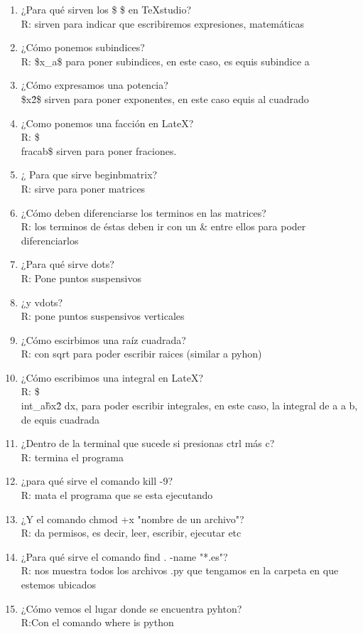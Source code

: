 \documentclass[letterpaper, 12pt, oneside]{article}%
\begin{document}
\begin{enumerate}
\item ¿Para qué sirven los \$ \$ en TeXstudio?\\
R: sirven para indicar que escribiremos expresiones, matemáticas
\item ¿Cómo ponemos subindices?\\
R: \$x\_{a}\$ para poner subindices, en este caso, es equis subindice a
\item ¿Cómo expresamos una potencia?\\ \$x\^{2}\$ sirven para poner exponentes, en este caso equis al cuadrado
\item ¿Como ponemos una facción en LateX?\\ R: \$\\frac{a}{b}\$ sirven para poner fraciones.
\item ¿ Para que sirve begin{bmatrix}?\\ R: sirve para poner matrices
\item ¿Cómo deben diferenciarse los terminos en las matrices?\\
R: los terminos de éstas deben ir con un \& entre ellos para poder diferenciarlos
\item ¿Para qué sirve dots?\\
R: Pone puntos suspensivos
\item ¿y vdots?\\
R: pone puntos suspensivos  verticales
\item ¿Cómo escirbimos una raíz cuadrada?\\ R: con sqrt para poder escribir raices (similar a pyhon)
\item ¿Cómo escribimos una integral en LateX? \\
R: \$\\int\_{a}\^{b}x\^2 dx, para poder escribir integrales, en este caso, la integral de a a b, de equis cuadrada
\item ¿Dentro de la terminal que sucede si presionas ctrl más c?\\
R: termina el programa
\item ¿para qué sirve el comando kill -9?\\
R: mata el programa que se esta ejecutando
\item ¿Y el comando chmod +x "nombre de un archivo"?\\
R: da permisos, es decir, leer, escribir, ejecutar etc
\item ¿Para qué sirve el comando find . -name "*.es"?\\
R: nos muestra todos los archivos .py que tengamos en la carpeta en que estemos ubicados
\item ¿Cómo vemos el lugar donde se encuentra pyhton? \\ 
R:Con el comando where is python


\end{enumerate}
\end{document}
